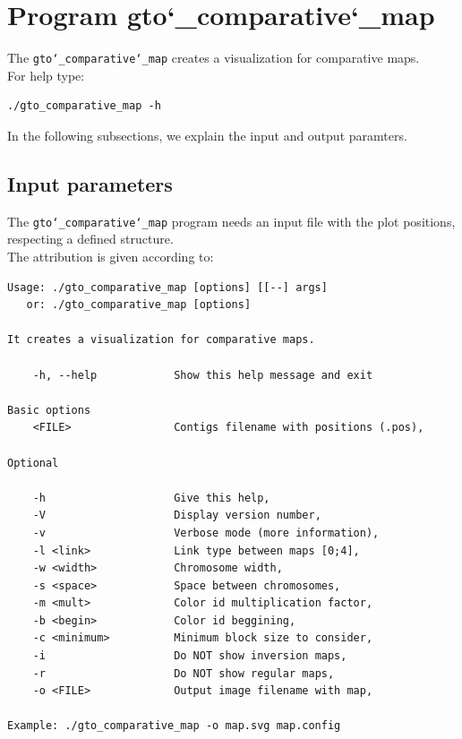 \section{Program gto\char`_comparative\char`_map}
The \texttt{gto\char`_comparative\char`_map} creates a visualization for comparative maps.\\
For help type:
\begin{lstlisting}
./gto_comparative_map -h
\end{lstlisting}
In the following subsections, we explain the input and output paramters.

\subsection*{Input parameters}

The \texttt{gto\char`_comparative\char`_map} program needs an input file with the plot positions, respecting a defined structure.\\
The attribution is given according to:
\begin{lstlisting}
Usage: ./gto_comparative_map [options] [[--] args]                        
   or: ./gto_comparative_map [options]                                    
                                                                          
It creates a visualization for comparative maps.                          
                                                                          
    -h, --help            Show this help message and exit                 
                                                                          
Basic options                                                             
    <FILE>                Contigs filename with positions (.pos),         
                                                                          
Optional                                                                  
                                                                          
    -h                    Give this help,                                 
    -V                    Display version number,                         
    -v                    Verbose mode (more information),                
    -l <link>             Link type between maps [0;4],                   
    -w <width>            Chromosome width,                               
    -s <space>            Space between chromosomes,                      
    -m <mult>             Color id multiplication factor,                 
    -b <begin>            Color id beggining,                             
    -c <minimum>          Minimum block size to consider,                 
    -i                    Do NOT show inversion maps,                     
    -r                    Do NOT show regular maps,                       
    -o <FILE>             Output image filename with map,                 
                                                                          
Example: ./gto_comparative_map -o map.svg map.config 
\end{lstlisting}
